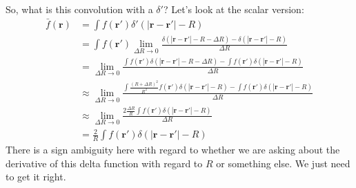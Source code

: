 \documentclass[letterpaper,twocolumn,amsmath,amssymb,prb]{revtex4-1}
\begin{document}
So, what is this convolution with a $\delta'$? Let's look at the
scalar version:
\begin{align}
  \bar{f}(\mathbf{r})
  &= \int f(\mathbf{r'}) \delta'(|\mathbf{r}-\mathbf{r'}| - R)
  \\
  &= \int
        f(\mathbf{r'})
        \lim_{\Delta R \rightarrow 0}
          \frac{\delta(|\mathbf{r}-\mathbf{r'}| - R - \Delta R)
            -
            \delta(|\mathbf{r}-\mathbf{r'}| - R)
      }{\Delta R}
  \\
  &= \lim_{\Delta R \rightarrow 0}
          \frac{\int
            f(\mathbf{r'})
            \delta(|\mathbf{r}-\mathbf{r'}| - R - \Delta R)
            -
            \int
            f(\mathbf{r'})
            \delta(|\mathbf{r}-\mathbf{r'}| - R)
      }{\Delta R}
  \\
  &\approx\lim_{\Delta R \rightarrow 0}
          \frac{\int
            \frac{(R+\Delta R)^2}{R^2}f(\mathbf{r'})
            \delta(|\mathbf{r}-\mathbf{r'}| - R)
            -
            \int
            f(\mathbf{r'})
            \delta(|\mathbf{r}-\mathbf{r'}| - R)
      }{\Delta R}
  \\
  &\approx\lim_{\Delta R \rightarrow 0}
          \frac{2\frac{\Delta R}{R} \int
            f(\mathbf{r'})
            \delta(|\mathbf{r}-\mathbf{r'}| - R)
      }{\Delta R}
  \\
  &= \frac{2}{R} \int
            f(\mathbf{r'})
            \delta(|\mathbf{r}-\mathbf{r'}| - R)
\end{align}
There is a sign ambiguity here with regard to whether we are asking
about the derivative of this delta function with regard to $R$ or
something else.  We just need to get it right.
\end{document}

